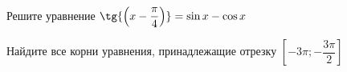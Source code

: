 \begin{ex}
	\begin{condition}
		\begin{enumcols}[label=\asbuk*)]
			\item Решите уравнение \(  \tg{\left(x -\dfrac{\pi}{4}\right)} = \sin x - \cos x  \)
			\item Найдите все корни уравнения, принадлежащие отрезку \( \left[-3\pi;-\dfrac{3\pi}{2}\right] \)
		\end{enumcols}
	\end{condition}
\end{ex}